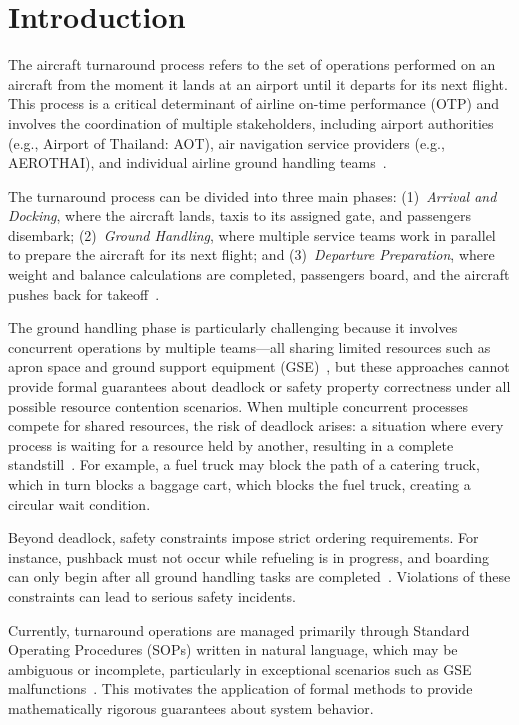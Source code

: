 \documentclass[conference]{IEEEtran}
\begin{document}
\section{Introduction}

The aircraft turnaround process refers to the set of operations performed on an
aircraft from the moment it lands at an airport until it departs for its next
flight. This process is a critical determinant of airline on-time performance
(OTP) and involves the coordination of multiple stakeholders, including airport
authorities (e.g., Airport of Thailand: AOT), air navigation service providers
(e.g., AEROTHAI), and individual airline ground handling teams~\cite{b1}.

The turnaround process can be divided into three main phases: (1)~\textit{Arrival
and Docking}, where the aircraft lands, taxis to its assigned gate, and passengers
disembark; (2)~\textit{Ground Handling}, where multiple service teams work in
parallel to prepare the aircraft for its next flight; and (3)~\textit{Departure
Preparation}, where weight and balance calculations are completed, passengers
board, and the aircraft pushes back for takeoff~\cite{b2}.

The ground handling phase is particularly challenging because it involves
concurrent operations by multiple teams---all sharing limited resources such as
apron space and ground support equipment (GSE)~\cite{b8,b11}, but these
approaches cannot provide formal guarantees about deadlock or safety property
correctness under all possible resource contention scenarios. When multiple
concurrent processes compete for shared resources, the risk of deadlock arises:
a situation where every process is waiting for a resource held by another,
resulting in a complete standstill~\cite{b3}. For example, a fuel truck may block
the path of a catering truck, which in turn blocks a baggage cart, which blocks
the fuel truck, creating a circular wait condition.

Beyond deadlock, safety constraints impose strict ordering requirements. For
instance, pushback must not occur while refueling is in progress, and boarding
can only begin after all ground handling tasks are completed~\cite{b4}. Violations
of these constraints can lead to serious safety incidents.

Currently, turnaround operations are managed primarily through Standard
Operating Procedures (SOPs) written in natural language, which may be ambiguous
or incomplete, particularly in exceptional scenarios such as GSE
malfunctions~\cite{b5}. This motivates the application of formal methods to
provide mathematically rigorous guarantees about system behavior.
\end{document}
